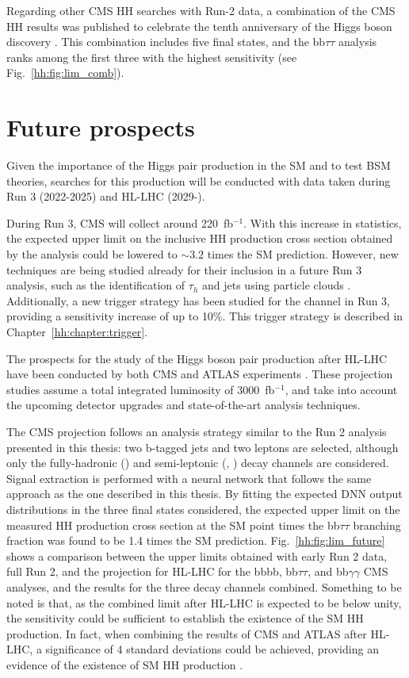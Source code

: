 \documentclass[../main.tex]{subfiles}
\begin{document}
Regarding other CMS HH searches with Run-2 data, a combination of the CMS HH results was published to celebrate the tenth anniversary of the Higgs boson discovery \cite{hh:analysis:nature}. This combination includes five final states, and the bb$\tau\tau$ analysis ranks among the first three with the highest sensitivity (see Fig.~\ref{hh:fig:lim_comb}). 

\section{Future prospects}

Given the importance of the Higgs pair production in the SM and to test BSM theories, searches for this production will be conducted with data taken during Run 3 (2022-2025) and HL-LHC (2029-).

During Run 3, CMS will collect around 220~fb$^{-1}$. With this increase in statistics, the expected upper limit on the inclusive HH production cross section obtained by the \hhbbtt{} analysis could be lowered to $\sim3.2$ times the SM prediction. However, new techniques are being studied already for their inclusion in a future Run 3 analysis, such as the identification of $\tau_h$ and jets using particle clouds \cite{hh:results:particlenet}. Additionally, a new trigger strategy has been studied for the \tauh\tauh{} channel in Run 3, providing a sensitivity increase of up to 10\%. This trigger strategy is described in Chapter~\ref{hh:chapter:trigger}.

The prospects for the study of the Higgs boson pair production after HL-LHC have been conducted by both CMS and ATLAS experiments \cite{hh:analysis:nature, hh:results:future, hh:analysis:hh_hllhc}. These projection studies assume a total integrated luminosity of 3000~fb${}^{-1}$, and take into account the upcoming detector upgrades and state-of-the-art analysis techniques. 

The CMS \hhbbtt{} projection \cite{hh:analysis:hh_hllhc} follows an analysis strategy similar to the Run 2 analysis presented in this thesis: two b-tagged jets and two leptons are selected, although only the fully-hadronic (\tauh\tauh{}) and semi-leptonic (\taumu\tauh{}, \taue\tauh{}) decay channels are considered. Signal extraction is performed with a neural network that follows the same approach as the one described in this thesis. By fitting the expected DNN output distributions in the three final states considered, the expected upper limit on the measured HH production cross section at the SM point times the bb$\tau\tau$ branching fraction was found to be 1.4 times the SM prediction. Fig.~\ref{hh:fig:lim_future} shows a comparison between the upper limits obtained with early Run 2 data, full Run 2, and the projection for HL-LHC for the bbbb, bb$\tau\tau$, and bb$\gamma\gamma$ CMS analyses, and the results for the three decay channels combined. Something to be noted is that, as the combined limit after HL-LHC is expected to be below unity, the sensitivity could be sufficient to establish the existence of the SM HH production. In fact, when combining the results of CMS and ATLAS after HL-LHC, a significance of 4 standard deviations could be achieved, providing an evidence of the existence of SM HH production \cite{hh:results:future}.
\end{document}
